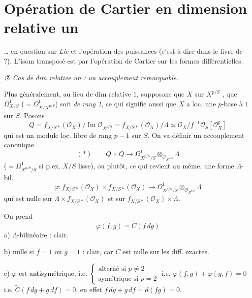 \documentclass[11pt,a4paper]{article}
\begin{document}
\section{Opération de Cartier en dimension relative un}

… en question \ill{} sur \emph{Lie} et l'opération des puissances
 (c'est-à-dire dans le livre de
 ?).
L'isom transposé est  par l'opération de Cartier sur les
formes différentielles.

\emph{⑦ Cas  de dim relative un : un accouplement remarquable.}

 Plus généralement, au lieu de dim relative $1$,
supposons que $X$ sur $X^{p/S}$ \struck{\ill{}}, que $\Omega^1_{X/S}$
($=\Omega^1_{X/X^{p/S}}$) soit \emph{ de rang 1}, ce qui signifie aussi que
$X$ a loc. une $p$-base à $1$  sur $S$. Posons
\[
  Q = f_{X/S*}(\mathcal{O}_X)/\operatorname{Im}\mathcal{O}_{X^{p/S}}
    = f_{X/S*}(\mathcal{O}_X)/\Lambda
    \simeq \mathcal{O}_X/f^{-1}\mathcal{O}_S[\mathcal{O}_X^{p}]
\]
qui est un module loc. libre de rang $p-1$ sur $S$. On va définir un
accouplement  canonique
\[
  (*)\qquad Q\times Q \longrightarrow
  \Omega^1_{X^{p/S}/S}\otimes_{\mathcal{O}_{X^{p/S}}}\Lambda
\]
($=\Omega^1_{X^{p/S}/S}$ si p.ex. $X/S$ lisse), ou plutôt, ce qui revient au
même, une forme $\Lambda$-bil.
\[
  \varphi : f_{X/S*}(\mathcal{O}_X)\times f_{X/S*}(\mathcal{O}_X)
  \longrightarrow \Omega^1_{X^{p/S}/S}\otimes_{\mathcal{O}_{X^{p/S}}}\Lambda
\]
qui est nulle sur $\Lambda\times f_{X/S*}(\mathcal{O}_X)$ et sur
$f_{X/S*}(\mathcal{O}_X)\times\Lambda$.

On prend
\[
  \varphi(f,g) = \widetilde{C}(f\,dg)
\]
a) $\Lambda$-bilinéaire : clair.

b) nulle si  $f=1$ ou $g=1$ : clair, car
$\widetilde{C}$ est nulle sur les diff. exactes.

c) $\varphi$ est antisymétrique, i.e.
$\left\{\begin{array}{l}\text{alterné si } p\neq 2\\ \text{symétrique si } p=2\end{array}\right.$
i.e. $\varphi(f,g)+\varphi(g,f)=0$ i.e.
$\widetilde{C}(f\,dg+g\,df)=0$, en effet $f\,dg+g\,df = d(fg) = 0$.
\end{document}
